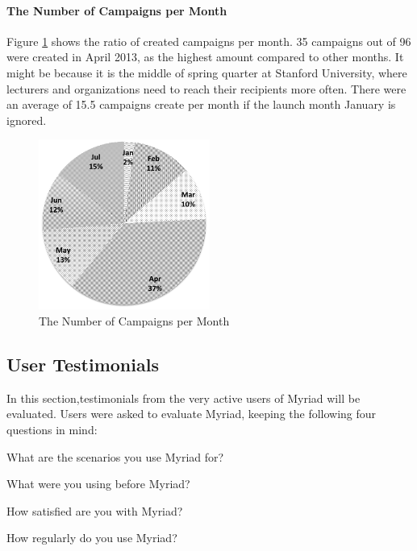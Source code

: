 \clearpage

\paragraph{The Number of Campaigns per Month} Figure \ref{fig:ChartCampaignsMonths} shows the ratio of created campaigns per month. 35 campaigns out of 96 were created in April 2013, as the highest amount compared to other months. It might be because it is the middle of spring quarter at Stanford University, where lecturers and organizations need to reach their recipients more often. There were an average of 15.5 campaigns create per month if the launch month January is ignored.

\begin{figure}[htbp]
	\centering
	\includegraphics[width=0.50\textwidth]{imgs/ChartCampaignsMonths.png}
	\caption[The Number of Campaigns per Month]{The Number of Campaigns per Month}
	\label{fig:ChartCampaignsMonths}
\end{figure}

\subsection{User Testimonials}
\label{subsec:5.4.2:UserTest}

In this section,testimonials from the very active users of Myriad will be evaluated. Users were asked to evaluate Myriad, keeping the following four questions in mind:

\begin{compactenum}
	\item What are the scenarios you use Myriad for?
	\item What were you using before Myriad?
	\item How satisfied are you with Myriad?
	\item How regularly do you use Myriad?
\end{compactenum}

